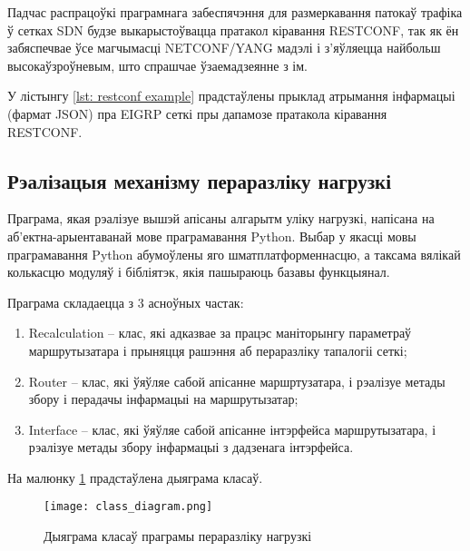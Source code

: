 Падчас распрацоўкі праграмнага забеспячэння для размеркавання патокаў
трафіка ў сетках SDN будзе выкарыстоўвацца пратакол кіравання RESTCONF,
так як ён забяспечвае ўсе магчымасці NETCONF/YANG мадэлі і з'яўляецца
найбольш высокаўзроўневым, што спрашчае ўзаемадзеянне з ім.

У лістынгу \ref{lst: restconf example} прадстаўлены прыклад атрымання інфармацыі (фармат JSON) пра EIGRP сеткі пры дапамозе пратакола кіравання RESTCONF.



\vspace{-\baselineskip}

\subsection{Рэалізацыя механізму пераразліку нагрузкі}

Праграма, якая рэалізуе вышэй апісаны алгарытм уліку нагрузкі, напісана
на аб'ектна-арыентаванай мове праграмавання Python. Выбар у якасці мовы праграмавання
Python абумоўлены яго шматплатформеннасцю, а таксама вялікай колькасцю модуляў і бібліятэк, якія пашыраюць базавы функцыянал.

Праграма складаецца з 3 асноўных частак:
\begin{enumerate}
    \item Recalculation -- клас, які адказвае за працэс маніторынгу параметраў маршрутызатара і прыняцця рашэння аб
    пераразліку тапалогіі сеткі;
    \item Router -- клас, які ўяўляе сабой апісанне маршртузатара, і рэалізуе
    метады збору і перадачы інфармацыі на маршрутызатар;
    \item Interface -- клас, які ўяўляе сабой апісанне інтэрфейса маршрутызатара,
    і рэалізуе метады збору інфармацыі з дадзенага інтэрфейса.
\end{enumerate}

На малюнку \ref{uml: Class Diagram} прадстаўлена дыяграма класаў.

\clearpage

\begin{figure}[ht!]
    \centering
    \texttt{[image: class\_diagram.png]}
    \caption{Дыяграма класаў праграмы пераразліку нагрузкі}
    \label{uml: Class Diagram}
\end{figure}

